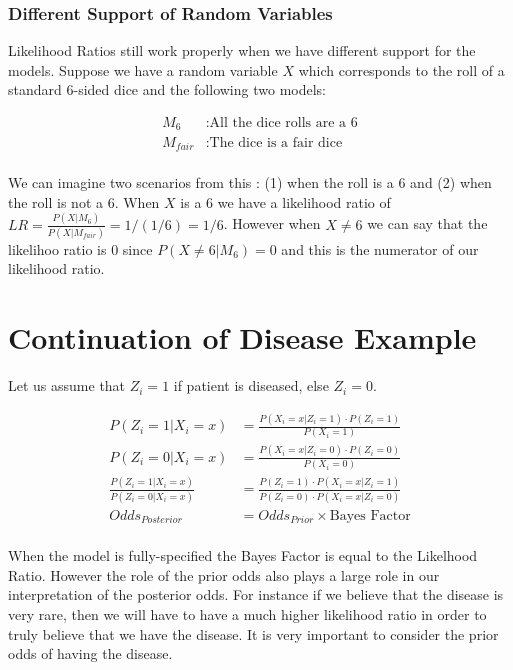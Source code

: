 \documentclass[12pt]{report}
\begin{document}
\subsubsection{Different Support of Random Variables}

Likelihood Ratios still work properly when we have different support for the models. Suppose we have a random variable $X$ which corresponds to the roll of a standard 6-sided dice and the following two models: 

\begin{align*}
M_6 &: \text{All the dice rolls are a 6}\\
M_{fair} &: \text{The dice is a fair dice}\\
\end{align*}

We can imagine two scenarios from this : (1) when the roll is a 6 and (2) when the roll is not a 6. When $X$ is a 6 we have a likelihood ratio of $LR = \frac{P(X | M_6)}{P(X | M_{fair})} = 1/(1/6) = 1/6$. However when $X \neq 6$ we can say that the likelihoo ratio is 0 since $P(X \neq 6 | M_6) = 0$ and this is the numerator of our likelihood ratio.

\section{Continuation of Disease Example}

Let us assume that $Z_i = 1$ if patient is diseased, else $Z_i = 0$. 

\begin{align*}
P(Z_i = 1 | X_i = x) &= \frac{P(X_i = x | Z_i = 1) \cdot P(Z_i = 1)}{P(X_i = 1)}\\
P(Z_i = 0 | X_i = x) &= \frac{P(X_i = x | Z_i = 0) \cdot P(Z_i = 0)}{P(X_i = 0)}\\
\frac{P(Z_i = 1 | X_i = x)}{P(Z_i = 0 | X_i = x)} &= \frac{P(Z_i = 1)\cdot P(X_i = x | Z_i = 1)}{ P(Z_i = 0) \cdot P(X_i = x | Z_i = 0) }\\
Odds_{Posterior} &= Odds_{Prior} \times \text{Bayes Factor}\\
\end{align*}

When the model is fully-specified the Bayes Factor is equal to the Likelhood Ratio. However the role of the prior odds also plays a large role in our interpretation of the posterior odds. For instance if we believe that the disease is very rare, then we will have to have a much higher likelihood ratio in order to truly believe that we have the disease. It is very important to consider the prior odds of having the disease. 
\end{document}

